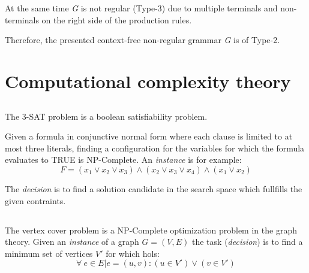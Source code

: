 \documentclass[11pt]{article}
\begin{document}
At the same time \emph{G} is not regular (Type-3) due to multiple terminals and non-terminals on the right side of the production rules.

Therefore, the presented context-free non-regular grammar \emph{G} is of Type-2.

\section{Computational complexity theory}
\subsection{}
The 3-SAT problem is a boolean satisfiability problem. 

Given a formula in conjunctive normal form where each clause is limited to at most three literals, finding a configuration for the variables for which the formula evaluates to TRUE is NP-Complete. An \emph{instance} is for example:
\begin{equation*}
	F=(x_1 \lor x_2\lor x_3)\land(x_2\lor x_3 \lor x_4)\land(x_1 \lor x_2)
\end{equation*}

The \emph{decision} is to find a solution candidate in the search space which fullfills the given contraints.

\subsection{}
The vertex cover problem is a NP-Complete optimization problem in the graph theory. Given an \emph{instance} of a graph  $G=(V,E)$ the task (\emph{decision}) is to find a minimum set of vertices $V'$ for which hols:
\begin{equation*}
	\forall \: e \in E| e=(u,v):(u\in V')\lor (v \in V')
\end{equation*}

\subsection{}
\end{document}
